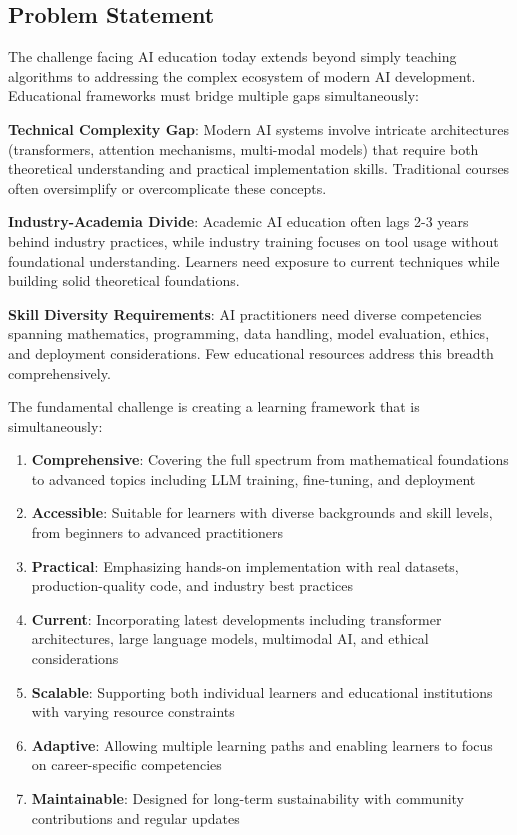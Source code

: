 \subsection{Problem Statement}

The challenge facing AI education today extends beyond simply teaching algorithms to addressing the complex ecosystem of modern AI development. Educational frameworks must bridge multiple gaps simultaneously:

\textbf{Technical Complexity Gap}: Modern AI systems involve intricate architectures (transformers, attention mechanisms, multi-modal models) that require both theoretical understanding and practical implementation skills. Traditional courses often oversimplify or overcomplicate these concepts.

\textbf{Industry-Academia Divide}: Academic AI education often lags 2-3 years behind industry practices, while industry training focuses on tool usage without foundational understanding. Learners need exposure to current techniques while building solid theoretical foundations.

\textbf{Skill Diversity Requirements}: AI practitioners need diverse competencies spanning mathematics, programming, data handling, model evaluation, ethics, and deployment considerations. Few educational resources address this breadth comprehensively.

The fundamental challenge is creating a learning framework that is simultaneously:
\begin{enumerate}
    \item \textbf{Comprehensive}: Covering the full spectrum from mathematical foundations to advanced topics including LLM training, fine-tuning, and deployment
    \item \textbf{Accessible}: Suitable for learners with diverse backgrounds and skill levels, from beginners to advanced practitioners
    \item \textbf{Practical}: Emphasizing hands-on implementation with real datasets, production-quality code, and industry best practices
    \item \textbf{Current}: Incorporating latest developments including transformer architectures, large language models, multimodal AI, and ethical considerations
    \item \textbf{Scalable}: Supporting both individual learners and educational institutions with varying resource constraints
    \item \textbf{Adaptive}: Allowing multiple learning paths and enabling learners to focus on career-specific competencies
    \item \textbf{Maintainable}: Designed for long-term sustainability with community contributions and regular updates
\end{enumerate}

